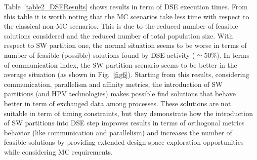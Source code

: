 %
Table~\ref{table2_DSEResults} shows results in term of DSE execution times. From this table it is worth noting that the MC scenarios take less time with respect to the classical non-MC scenarios. This is due to the reduced number of feasible solutions considered and the reduced number of total population size. With respect to SW partition one, the normal situation seems to be worse in terms of number of feasible (possible) solutions found by DSE activity ($\simeq 50 \%$). In terms of communication index, the SW partition scenario seems to be better in the average situation (as shown in Fig.~\ref{fig6}). 
Starting from this results, considering communication, parallelism and affinity metrics, the introduction of SW partitions (and HPV technologies) makes possible find solutions that behave better in term of exchanged data among processes. These solutions are not suitable in term of timing constraints, but they demonstrate how the introduction of SW partitions into DSE step improves results in terms of orthogonal metrics behavior (like communication and parallelism) and increases the number of feasible solutions by providing extended design space exploration opportunities while considering MC requirements. \par
%
